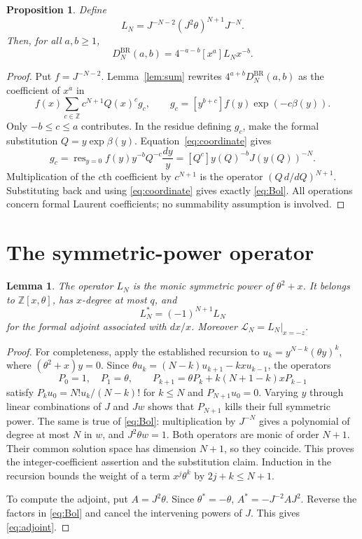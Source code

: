 \documentclass[11pt]{article}
\newtheorem{proposition}[theorem]{Proposition}
\newtheorem{lemma}[theorem]{Lemma}
\theoremstyle{definition}
\newcommand{\Z}{\mathbb Z}
\newcommand{\Res}{\operatorname{res}}
\newcommand{\BR}{\mathrm{BR}}
\numberwithin{equation}{section}
\begin{document}
\begin{proposition}\label{prop:coefficient}
Define
\begin{equation}\label{eq:Bol}
 L_N=J^{-N-2}(J^2\theta)^{N+1}J^{-N}.
\end{equation}
Then, for all $a,b\ge1$,
\begin{equation}\label{eq:coefficient}
 D_N^{\BR}(a,b)=4^{-a-b}[x^a]L_Nx^{-b}.
\end{equation}
\end{proposition}
\begin{proof}
Put $f=J^{-N-2}$. Lemma~\ref{lem:sum} rewrites $4^{a+b}D_N^{\BR}(a,b)$
as the coefficient of $x^a$ in
\[
 f(x)\sum_{c\in\Z}c^{N+1}Q(x)^cg_c,\qquad
 g_c=[y^{b+c}]f(y)\exp(-c\beta(y)).
\]
Only $-b\le c\le a$ contributes. In the residue defining $g_c$,
make the formal substitution $Q=y\exp\beta(y)$.
Equation~\eqref{eq:coordinate} gives
\[
 g_c=\Res_{y=0}f(y)y^{-b}Q^{-c}\frac{dy}{y}
    =[Q^c]y(Q)^{-b}J(y(Q))^{-N}.
\]
Multiplication of the $c$th coefficient by $c^{N+1}$ is the operator
$(Q\,d/dQ)^{N+1}$. Substituting back and using
\eqref{eq:coordinate} gives exactly \eqref{eq:Bol}.
All operations concern formal Laurent coefficients; no summability
assumption is involved.
\end{proof}

\section{The symmetric-power operator}

\begin{lemma}\label{lem:operator}
The operator $L_N$ is the monic symmetric power of $\theta^2+x$.
It belongs to $\Z[x,\theta]$, has $x$-degree at most $q$, and
\begin{equation}\label{eq:adjoint}
 L_N^*=(-1)^{N+1}L_N
\end{equation}
for the formal adjoint associated with $dx/x$.
Moreover $\mathcal L_N=L_N|_{x=-z}$.
\end{lemma}
\begin{proof}
For completeness, apply the established recursion to
$u_k=y^{N-k}(\theta y)^k$, where $(\theta^2+x)y=0$.
Since $\theta u_k=(N-k)u_{k+1}-kx u_{k-1}$, the operators
\[
 P_0=1,\quad P_1=\theta,\qquad
 P_{k+1}=\theta P_k+k(N+1-k)xP_{k-1}
\]
satisfy $P_ku_0=N!u_k/(N-k)!$ for $k\le N$ and $P_{N+1}u_0=0$.
Varying $y$ through linear combinations of $J$ and $Jw$ shows that
$P_{N+1}$ kills their full symmetric power.
The same is true of \eqref{eq:Bol}: multiplication by $J^{-N}$
gives a polynomial of degree at most $N$ in $w$, and $J^2\theta w=1$.
Both operators are monic of order $N+1$. Their common solution space
has dimension $N+1$, so they coincide.
This proves the integer-coefficient assertion and the substitution
claim. Induction in the recursion bounds the weight of a term
$x^j\theta^k$ by $2j+k\le N+1$.

To compute the adjoint, put $A=J^2\theta$. Since $\theta^*=-\theta$,
$A^*=-J^{-2}AJ^2$. Reverse the factors in \eqref{eq:Bol} and cancel
the intervening powers of $J$. This gives \eqref{eq:adjoint}.
\end{proof}
\end{document}
